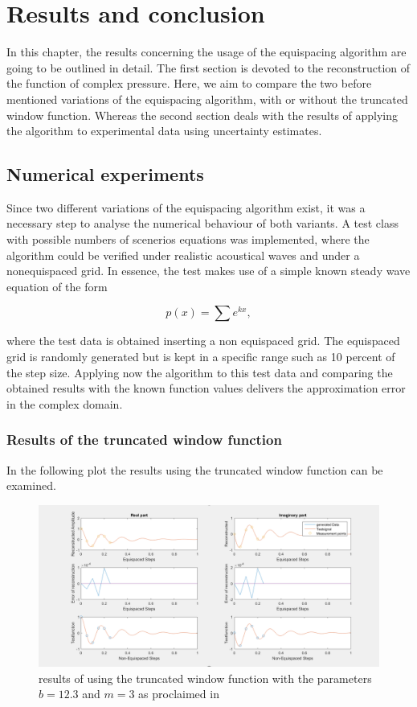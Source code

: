 \documentclass[11pt]{report} %
\begin{document}
\chapter{Results and conclusion}
In this chapter, the results concerning the usage of the equispacing algorithm are going to be outlined in detail. 
The first section is devoted to the reconstruction of the function of complex pressure.
Here, we aim to compare the two before mentioned variations of the equispacing algorithm, with or without the truncated window function. 
Whereas the second section deals with the results of applying the algorithm to experimental data using uncertainty estimates. 
 
\section{Numerical experiments}
Since two different variations of the equispacing algorithm exist, it was a necessary step to analyse the numerical behaviour of both variants.
A test class with possible numbers of scenerios equations was implemented, where the  
algorithm could be verified under realistic acoustical waves and under a nonequispaced grid.
In essence, the test makes use of a simple known steady wave equation of the form

\begin{equation}
p(x)= \sum e^{kx},
\end{equation}

where the test data is obtained inserting a non equispaced grid. 
The equispaced grid is randomly generated but is kept in a specific range such as 10 percent of the step size. 
Applying now the algorithm to this test data and comparing the obtained results with the known function values delivers the approximation error in the complex domain.

\subsection{Results of the truncated window function}
In the following plot the results using the truncated window function can be examined. 

\begin{figure}[H]
\centering
\includegraphics[scale=0.8]{./Figures/plot_trunc}
\caption{results of using the truncated window function with the parameters $b=12.3$ and $m=3$ as proclaimed in }
\end{figure}
\end{document}
